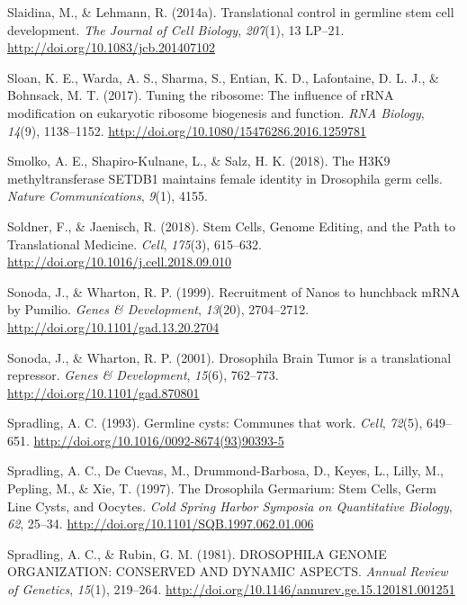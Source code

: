 \documentclass[12pt,twoside]{reedthesis}
\newlength{\cslhangindent}
\newenvironment{cslreferences}%
  {\setlength{\parindent}{0pt}%
  \everypar{\setlength{\hangindent}{\cslhangindent}}\ignorespaces}%
  {\par}
\begin{document}
\begin{cslreferences}
\leavevmode\hypertarget{ref-Slaidina2014h}{}%
Slaidina, M., \& Lehmann, R. (2014a). Translational control in germline stem cell development. \emph{The Journal of Cell Biology}, \emph{207}(1), 13 LP--21. \url{http://doi.org/10.1083/jcb.201407102}

\leavevmode\hypertarget{ref-Sloan2017e}{}%
Sloan, K. E., Warda, A. S., Sharma, S., Entian, K. D., Lafontaine, D. L. J., \& Bohnsack, M. T. (2017). Tuning the ribosome: The influence of rRNA modification on eukaryotic ribosome biogenesis and function. \emph{RNA Biology}, \emph{14}(9), 1138--1152. \url{http://doi.org/10.1080/15476286.2016.1259781}

\leavevmode\hypertarget{ref-Smolko2018}{}%
Smolko, A. E., Shapiro-Kulnane, L., \& Salz, H. K. (2018). The H3K9 methyltransferase SETDB1 maintains female identity in Drosophila germ cells. \emph{Nature Communications}, \emph{9}(1), 4155.

\leavevmode\hypertarget{ref-Soldner2018d}{}%
Soldner, F., \& Jaenisch, R. (2018). Stem Cells, Genome Editing, and the Path to Translational Medicine. \emph{Cell}, \emph{175}(3), 615--632. \url{http://doi.org/10.1016/j.cell.2018.09.010}

\leavevmode\hypertarget{ref-Sonoda1999a}{}%
Sonoda, J., \& Wharton, R. P. (1999). Recruitment of Nanos to hunchback mRNA by Pumilio. \emph{Genes \& Development}, \emph{13}(20), 2704--2712. \url{http://doi.org/10.1101/gad.13.20.2704}

\leavevmode\hypertarget{ref-Sonoda2001d}{}%
Sonoda, J., \& Wharton, R. P. (2001). Drosophila Brain Tumor is a translational repressor. \emph{Genes \& Development}, \emph{15}(6), 762--773. \url{http://doi.org/10.1101/gad.870801}

\leavevmode\hypertarget{ref-Spradling1993b}{}%
Spradling, A. C. (1993). Germline cysts: Communes that work. \emph{Cell}, \emph{72}(5), 649--651. \url{http://doi.org/10.1016/0092-8674(93)90393-5}

\leavevmode\hypertarget{ref-Spradling1997e}{}%
Spradling, A. C., De Cuevas, M., Drummond-Barbosa, D., Keyes, L., Lilly, M., Pepling, M., \& Xie, T. (1997). The Drosophila Germarium: Stem Cells, Germ Line Cysts, and Oocytes. \emph{Cold Spring Harbor Symposia on Quantitative Biology}, \emph{62}, 25--34. \url{http://doi.org/10.1101/SQB.1997.062.01.006}

\leavevmode\hypertarget{ref-Spradling1981b}{}%
Spradling, A. C., \& Rubin, G. M. (1981). DROSOPHILA GENOME ORGANIZATION: CONSERVED AND DYNAMIC ASPECTS. \emph{Annual Review of Genetics}, \emph{15}(1), 219--264. \url{http://doi.org/10.1146/annurev.ge.15.120181.001251}


\end{cslreferences}
\end{document}
